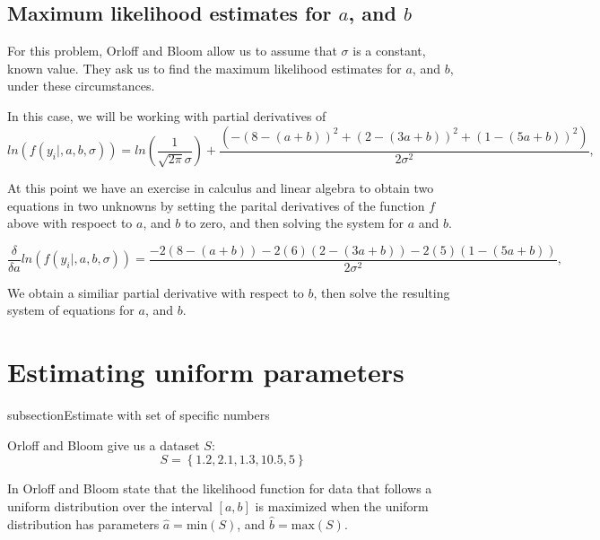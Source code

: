 \documentclass[a5paper,11pt]{article}
\begin{document}
\subsection{Maximum likelihood estimates for $a$, and $b$}

For this problem, Orloff and Bloom allow us to assume that $\sigma$ is a constant,
known value.  They ask us to find the maximum likelihood estimates for
$a$, and $b$, under these circumstances.

In this case, we will be working with partial derivatives of
\begin{equation}
ln \left( f\left(y_i \mid, a, b, \sigma\right) \right)
 =  ln \left( \frac{1}{\sqrt{2\pi}\sigma} \right) + 
		\frac{
			\left(-\left( 8 -\left(a +b\right)\right)^2
			+ \left( 2 -\left(3a +b\right)\right)^2
			+ \left( 1 -\left(5a +b\right)\right)^2\right)
		  }
		{2\sigma^2},
\end{equation}

At this point we have an exercise in calculus and linear algebra
to obtain two equations in two unknowns by setting the parital 
derivatives of the function $f$ above with respoect to $a$, and $b$
to zero, and then solving the system for $a$ and $b$.

\begin{equation}
\frac{\delta}{\delta a} ln \left( f\left(y_i \mid, a, b, \sigma\right) \right)
 =  	\frac{
			-2\left( 8 -\left(a +b\right)\right)
			- 2\left(6\right) \left( 2 -\left(3a +b\right)\right)
			- 2\left(5\right) \left( 1 -\left(5a +b\right)\right)
		  }
		{2\sigma^2},
\end{equation}

We obtain a similiar partial derivative with respect to $b$, then
solve the resulting system of equations for $a$, and $b$.


\section{Estimating uniform parameters}

subsection{Estimate with set of specific numbers}

Orloff and Bloom give us a dataset $S$:
\begin{equation}
S = \left\{1.2, 2.1, 1.3, 10.5, 5 \right\}
\end{equation}


In \cite{reading10b} Orloff and Bloom state that the likelihood
function for data that follows a uniform distribution over the
interval $\left[a, b \right]$ is maximized when the uniform distribution
has parameters $\hat{a} = \text{min}\left(S\right)$, and $\hat{b} =
\text{max}\left(S\right)$.
\end{document}
